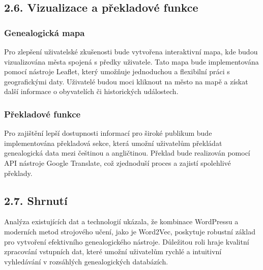 \documentclass[12pt]{report}
\begin{document}
\subsection{2.6. Vizualizace a překladové funkce}

\subsubsection{Genealogická mapa}
Pro zlepšení uživatelské zkušenosti bude vytvořena interaktivní mapa, kde budou vizualizována města spojená s předky uživatele. Tato mapa bude implementována pomocí nástroje Leaflet, který umožňuje jednoduchou a flexibilní práci s geografickými daty. Uživatelé budou moci kliknout na město na mapě a získat další informace o obyvatelích či historických událostech.

\subsubsection{Překladové funkce}
Pro zajištění lepší dostupnosti informací pro široké publikum bude implementována překladová sekce, která umožní uživatelům překládat genealogická data mezi češtinou a angličtinou. Překlad bude realizován pomocí API nástroje Google Translate, což zjednoduší proces a zajistí spolehlivé překlady.

\subsection{2.7. Shrnutí}
Analýza existujících dat a technologií ukázala, že kombinace WordPressu a moderních metod strojového učení, jako je Word2Vec, poskytuje robustní základ pro vytvoření efektivního genealogického nástroje. Důležitou roli hraje kvalitní zpracování vstupních dat, které umožní uživatelům rychlé a intuitivní vyhledávání v rozsáhlých genealogických databázích.
\end{document}
